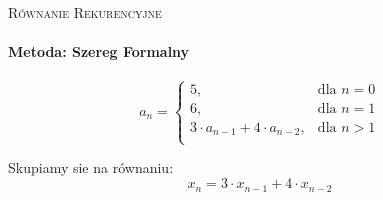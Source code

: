 \documentclass[12pt]{article}
\begin{document}
  \begin{center}  \LARGE\textsc{Równanie  Rekurencyjne}  \end{center}  
  \paragraph{Metoda: Szereg Formalny}    
 \begin{equation}{{a}}_{{n}} = \begin{cases}  {5}, &  \text{dla } n = 0 \\ {6}, &  \text{dla } n = 1 \\ {3}\cdot{{a}}_{{n-1}} + {4}\cdot{{a}}_{{n-2}}, &  \text{dla } n > 1 \\\end{cases}\end{equation}

\noindent Skupiamy sie na równaniu:
\begin{equation} {{x}}_{{n}} = {3}\cdot{{x}}_{{n-1}} + {4}\cdot{{x}}_{{n-2}}\end{equation}
\end{document}
